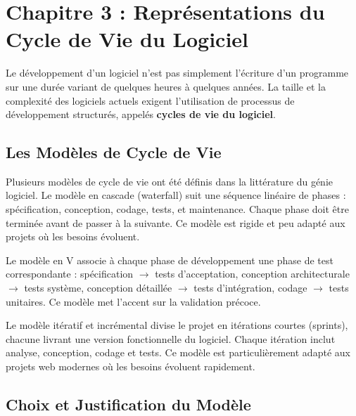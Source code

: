 
\section{Chapitre 3 : Représentations du Cycle de Vie du Logiciel}



Le développement d'un logiciel n'est pas simplement l'écriture d'un programme sur une durée variant de quelques heures à quelques années. La taille et la complexité des logiciels actuels exigent l'utilisation de processus de développement structurés, appelés \textbf{cycles de vie du logiciel}.



\subsection{Les Modèles de Cycle de Vie}



Plusieurs modèles de cycle de vie ont été définis dans la littérature du génie logiciel. Le modèle en cascade (waterfall) suit une séquence linéaire de phases : spécification, conception, codage, tests, et maintenance. Chaque phase doit être terminée avant de passer à la suivante. Ce modèle est rigide et peu adapté aux projets où les besoins évoluent.



Le modèle en V associe à chaque phase de développement une phase de test correspondante : spécification $\rightarrow$ tests d'acceptation, conception architecturale $\rightarrow$ tests système, conception détaillée $\rightarrow$ tests d'intégration, codage $\rightarrow$ tests unitaires. Ce modèle met l'accent sur la validation précoce.



Le modèle itératif et incrémental divise le projet en itérations courtes (sprints), chacune livrant une version fonctionnelle du logiciel. Chaque itération inclut analyse, conception, codage et tests. Ce modèle est particulièrement adapté aux projets web modernes où les besoins évoluent rapidement.



\subsection{Choix et Justification du Modèle}



